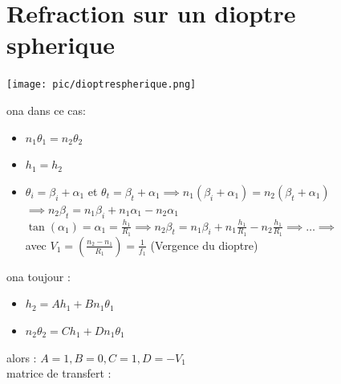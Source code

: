 \documentclass[12pt]{book}
\begin{document}
        \section{Refraction sur un dioptre spherique}
            \begin{center}
                \texttt{[image: pic/dioptrespherique.png]}
            \end{center}
            ona dans ce cas:
            \begin{itemize}
                \item $n_1\theta_1 = n_2\theta_2$
                \item $h_1 = h_2$
                \item $\theta_i =\beta_i + \alpha_1$ et $\theta_t =\beta_t + \alpha_1 \implies n_1(\beta_i + \alpha_1) = n_2(\beta_t + \alpha_1)  $ \\ 
                      $\implies n_2\beta_t = n_1\beta_i +n_1\alpha_1 - n_2\alpha_1$ \\
                      $\tan(\alpha_1) = \alpha_1 = \frac{h_1}{R_1} \implies n_2\beta_t = n_1\beta_i +n_1\frac{h_1}{R_1} - n_2\frac{h_1}{R_1} \implies \ldots \implies $ \\
                       avec $V_1 = (\frac{n_2-n_1}{R_1}) = \frac{1}{f_1}$ (Vergence du dioptre)
            \end{itemize}
            
            ona toujour :
            \begin{itemize}
                \item $ h_2 = Ah_1 + Bn_1\theta_1$
                \item $ n_2\theta_2 = Ch_1 + Dn_1\theta_1$
            \end{itemize}
            alors : $ A = 1 , B = 0 ,C = 1 , D = -V_1$ \\ 
            matrice de transfert : 
            \begin{center}
                 \\
            \end{center}
        
\end{document}
